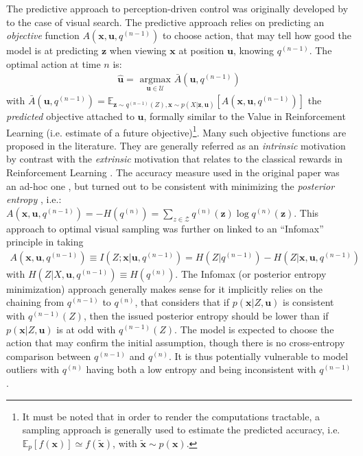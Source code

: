 \documentclass{article}
\begin{document}
The predictive approach to perception-driven control was originally developed by \cite{najemnik2005optimal} to the case of visual search.
The predictive approach relies on predicting an \emph{objective} function $A(\boldsymbol{x}, \boldsymbol{u}, q^{(n-1)})$ to choose action, that may tell how good the model is at predicting $\boldsymbol{z}$  when viewing $\boldsymbol{x}$ at position $\boldsymbol{u}$,
knowing $q^{(n-1)}$.
The optimal action at time $n$ is:
\begin{align}
\hat{\boldsymbol{u}} = \underset{\boldsymbol{u} \in \mathcal{U}}{\text{ argmax }} \bar{A}(\boldsymbol{u}, q^{(n-1)})
\label{eq:predictive-policy}
\end{align}
with $\bar{A}(\boldsymbol{u}, q^{(n-1)})
= \mathbb{E}_{\boldsymbol{z} \sim q^{(n-1)}(Z), \boldsymbol{x} \sim p(X|\boldsymbol{z}, \boldsymbol{u})}\left[A(\boldsymbol{x}, \boldsymbol{u}, q^{(n-1)})\right]$ the \emph{predicted} objective attached to $\boldsymbol{u}$, 
formally similar to the Value in Reinforcement Learning (i.e. estimate of a future objective)\footnote{It must be noted that in order to render the computations tractable, a sampling approach is generally used to estimate the predicted accuracy, i.e. $\mathbb{E}_p[f(\boldsymbol{x})] \simeq f(\tilde{\boldsymbol{x}})$, with $\tilde{\boldsymbol{x}}\sim p(\boldsymbol{x})$.}.
Many such objective functions are proposed in the literature. They are generally referred as an \emph{intrinsic} motivation \cite{oudeyer2008can} by contrast with the \emph{extrinsic} motivation that relates to the classical rewards in Reinforcement Learning \cite{sutton1998reinforcement}.
The accuracy measure used in the original paper was an ad-hoc one \cite{najemnik2005optimal}, but turned out to be consistent with minimizing the \emph{posterior entropy} \cite{najemnik2009simple}, i.e.:
$A(\boldsymbol{x}, \boldsymbol{u}, q^{(n-1)}) = -H(q^{(n)}) = \sum_{z \in \mathcal{Z}} q^{(n)}(\boldsymbol{z}) \log q^{(n)}(\boldsymbol{z})$. This approach to optimal visual sampling was further on linked to an ``Infomax'' principle in \cite{butko2010infomax} 
taking
\begin{align}A(\boldsymbol{x}, \boldsymbol{u}, q^{(n-1)}) \equiv I(Z; \boldsymbol{x}|\boldsymbol{u}, q^{(n-1)})
= H(Z|q^{(n-1)}) - H(Z|\boldsymbol{x}, \boldsymbol{u}, q^{(n-1)})
\label{eq:infomax}
\end{align}
with  $H(Z|X, \boldsymbol{u}, q^{(n-1)}) \equiv H(q^{(n)})$.
The Infomax (or posterior entropy minimization) approach generally makes sense for it implicitly relies on the chaining from $q^{(n-1)}$ to $q^{(n)}$, that considers that if $p(\boldsymbol{x}|Z, \boldsymbol{u})$ is consistent with $q^{(n-1)}(Z)$, then the issued posterior entropy should be lower than if $p(\boldsymbol{x}|Z, \boldsymbol{u})$ is at odd with $q^{(n-1)}(Z)$. The model is expected to choose the action that may confirm the initial assumption, though there is no cross-entropy comparison between $q^{(n-1)}$ and $q^{(n)}$.
It is thus potentially vulnerable to model outliers with $q^{(n)}$ having both a low entropy and being inconsistent with $q^{(n-1)}$. 
\end{document}

